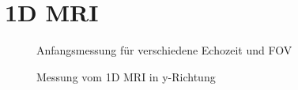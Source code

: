 \section{1D MRI}
\begin{figure}[H]
    \centering
    
    \caption{Anfangsmessung für verschiedene Echozeit und FOV}
\end{figure}

\begin{figure}[H]
    \centering
    
    \caption{Messung vom 1D MRI in y-Richtung}
\end{figure}